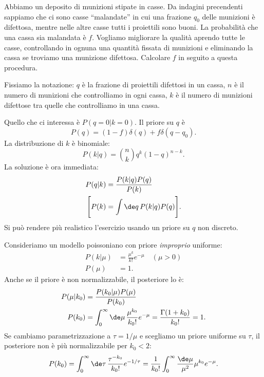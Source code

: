\begin{exercise}
	Abbiamo un deposito di munizioni stipate in casse.
	Da indagini precendenti sappiamo che ci sono casse ``malandate''
	in cui una frazione $q_0$ delle munizioni è difettosa,
	mentre nelle altre casse tutti i proiettili sono buoni.
	La probabilità che una cassa sia malandata è $f$.
	Vogliamo migliorare la qualità aprendo tutte le casse,
	controllando in ognuna una quantità fissata di munizioni e
	eliminando la cassa se troviamo una munizione difettosa.
	Calcolare $f$ in seguito a questa procedura.
\end{exercise}

\begin{solution*}
	Fissiamo la notazione:
	$q$ è la frazione di proiettili difettosi in un cassa,
	$n$ è il numero di munizioni che controlliamo in ogni cassa,
	$k$ è il numero di munizioni difettose tra quelle che controlliamo in una cassa.
	
	Quello che ci interessa è $P(q=0|k=0)$.
	Il priore su $q$ è
	\begin{equation*}
		P(q) = (1-f) \delta(q) + f \delta(q-q_0).
	\end{equation*}
	La distribuzione di $k$ è binomiale:
	\begin{equation*}
		P(k|q) = \binom nk q^k (1-q)^{n-k}.
	\end{equation*}
	La soluzione è ora immediata:
	\begin{align*}
		P(q|k) &= \frac{P(k|q) P(q)}{P(k)} \\
		\Bigg[ P(k) &= \int \de q\, P(k|q) P(q) \Bigg].
	\end{align*}
	Si può rendere più realistico l'esercizio usando un priore su $q$ non discreto.
\end{solution*}


\begin{example}
	Consideriamo un modello poissoniano con priore \emph{improprio} uniforme:
	\begin{align*}
		P(k|\mu) &= \frac{\mu^k}{k!}e^{-\mu} \quad (\mu > 0) \\
		P(\mu) &= 1.
	\end{align*}
	Anche se il priore è non normalizzabile, il posteriore lo è:
	\begin{align*}
		P(\mu|k_0) &= \frac{P(k_0|\mu) P(\mu)}{P(k_0)} \\
		P(k_0) &= \int_0^\infty \de\mu\, \frac{\mu^{k_0}}{k_0!}e^{-\mu} = \frac{\Gamma(1+k_0)}{k_0!} = 1.
	\end{align*}
	Se cambiamo parametrizzazione a $\tau=1/\mu$ e scegliamo un priore uniforme su $\tau$,
	il posteriore non è più normalizzabile per $k_0<2$:
	\begin{equation*}
		P(k_0)
		= \int_0^\infty \de\tau\, \frac{\tau^{-k_0}}{k_0!}e^{-1/\tau}
		= \frac1{k_0!} \int_0^\infty \frac{\de\mu}{\mu^2} \mu^{k_0}e^{-\mu}.
	\end{equation*}
\end{example}

